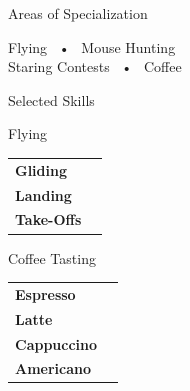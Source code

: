 \documentclass[darkstylish]{stylishcv} %
\begin{document}
		\begin{center}
			\begin{darkshadedcvbox}Areas of Specialization\end{darkshadedcvbox}
		\end{center}
		{\footnotesize \begin{center}Flying ~•~ Mouse Hunting\\ Staring Contests ~•~ Coffee\end{center}}
		\smallskip
		\vspace{-0.25cm}



		\begin{darkshadedcvbox}Selected Skills\end{darkshadedcvbox}

		\begin{center}\begin{shadedcvbox}Flying\end{shadedcvbox}\end{center}
		\begin{tabular}{L{1.35cm} r}
			\hspace{-0.45cm}\textbf{Gliding} & \\
			\hspace{-0.45cm}\textbf{Landing} &  \\
			\hspace{-0.45cm}\textbf{Take-Offs} &  \\
		\end{tabular}
		\smallskip

		\begin{center}\begin{shadedcvbox}Coffee Tasting\end{shadedcvbox}\end{center}
		\begin{tabular}{L{1.35cm} r}
			\hspace{-0.45cm}\textbf{Espresso} & \\
			\hspace{-0.45cm}\textbf{Latte} &  \\
			\hspace{-0.45cm}\textbf{Cappuccino} &  \\
			\hspace{-0.45cm}\textbf{Americano} &  \\
		\end{tabular}
\end{document}
